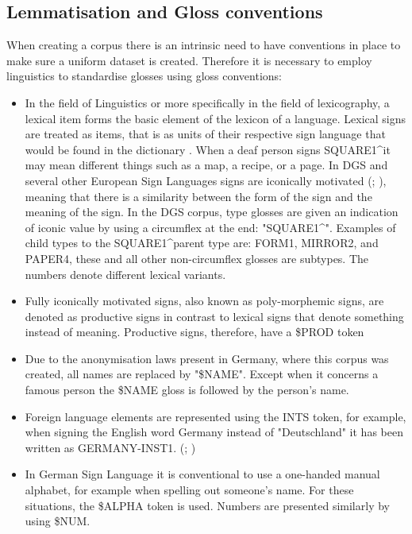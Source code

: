 \subsection{Lemmatisation and Gloss conventions}

When creating a corpus there is an intrinsic need to have conventions in place to make sure a uniform dataset is created. \cite{konradoffentliches} Therefore it is necessary to employ linguistics to standardise glosses using gloss conventions: \cite{kristoffersen2016designing}

\begin{itemize}
    \item In the field of Linguistics or more specifically in the field of lexicography, a lexical item forms the basic element of the lexicon of a language. Lexical signs are treated as items, that is as units of their respective sign language that would be found in the dictionary \cite{konradoffentliches}. When a deaf person signs SQUARE1\textasciicircum  it may mean different things such as a map, a recipe, or a page. In DGS \cite{perniss2007space} and several other European Sign Languages signs are iconically motivated (\citealp{pietrandrea2002iconicity}; \citealp{oomen2017iconicity}), meaning that there is a similarity between the form of the sign and the meaning of the sign. In the DGS corpus, type glosses are given an indication of iconic value by using a circumflex at the end: "SQUARE1\textasciicircum ". Examples of child types to the SQUARE1\textasciicircum parent type are: FORM1, MIRROR2, and PAPER4, these and all other non-circumflex glosses are subtypes. The numbers denote different lexical variants.
    \item Fully iconically motivated signs, also known as poly-morphemic signs, are denoted as productive signs in contrast to lexical signs that denote something instead of meaning. Productive signs, therefore, have a \$PROD token \cite{konradoffentliches}
    \item Due to the anonymisation laws present in Germany, where this corpus was created, all names are replaced by "\$NAME". Except when it concerns a famous person the \$NAME gloss is followed by the person's name. \cite{konradoffentliches}
    \item Foreign language elements are represented using the INTS token, for example, when signing the English word Germany instead of "Deutschland" it has been written as GERMANY-INST1. (\citealp{kellett2008english}; \citealp{konradoffentliches})
    \item In German Sign Language it is conventional to use a one-handed manual alphabet, for example when spelling out someone's name. For these situations, the \$ALPHA token is used. Numbers are presented similarly by using \$NUM. \cite{konradoffentliches}  
\end{itemize}

